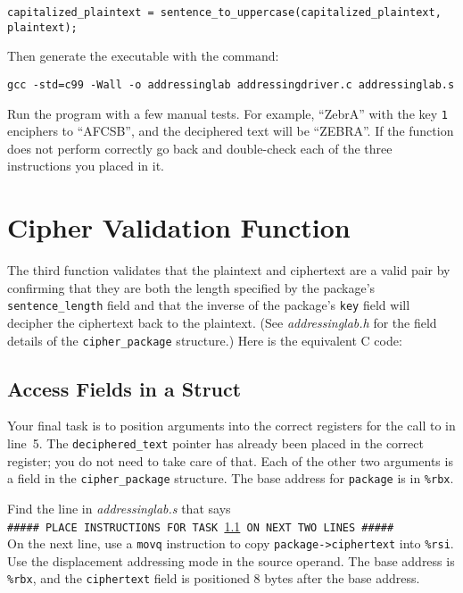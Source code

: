 \begin{lstlisting}
capitalized_plaintext = sentence_to_uppercase(capitalized_plaintext, plaintext);
\end{lstlisting}
Then generate the executable with the command:

\texttt{gcc -std=c99 -Wall -o addressinglab addressingdriver.c addressinglab.s}

Run the program with a few manual tests. For example, ``ZebrA'' with the key
\texttt{1} enciphers to ``AFCSB'', and the deciphered text will be ``ZEBRA''.
If the function does not perform correctly go back and double-check each of the
three instructions you placed in it.


\section{Cipher Validation Function}

The third function validates that the plaintext and ciphertext are a valid pair
by confirming that they are both the length specified by the package's
\lstinline{sentence_length} field and that the inverse of the package's
\lstinline{key} field will decipher the ciphertext back to the plaintext. (See
\textit{addressinglab.h} for the field details of the
\lstinline{cipher_package} structure.) Here is the equivalent C code:



\subsection{Access Fields in a Struct}\label{task8}

Your final task is to position arguments into the correct registers for the
call to  in line~5. The \lstinline{deciphered_text}
pointer has already been placed in the correct register; you do not need to
take care of that. Each of the other two arguments is a field in the
\lstinline{cipher_package} structure. The base address for \lstinline{package}
is in \lstinline{%rbx}.

Find the line in \textit{addressinglab.s} that says \\
\texttt{\#\#\#\#\# PLACE INSTRUCTIONS FOR TASK \ref{task8} ON NEXT TWO LINES \#\#\#\#\#} \\
On the next line, use a \lstinline{movq} instruction to copy
\lstinline{package->ciphertext} into \lstinline{%rsi}. Use the displacement
addressing mode in the source operand. The base address is \lstinline{%rbx},
and the \lstinline{ciphertext} field is positioned 8 bytes after the base
address.


